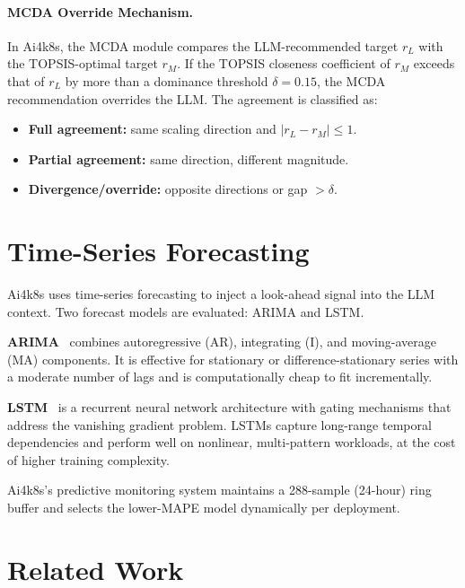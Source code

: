\paragraph{MCDA Override Mechanism.}
In Ai4k8s, the MCDA module compares the LLM-recommended target $r_L$ with the
TOPSIS-optimal target $r_M$. If the TOPSIS closeness coefficient of $r_M$ exceeds
that of $r_L$ by more than a dominance threshold $\delta = 0.15$, the MCDA
recommendation overrides the LLM. The agreement is classified as:
\begin{itemize}
  \item \textbf{Full agreement:} same scaling direction and $|r_L - r_M| \leq 1$.
  \item \textbf{Partial agreement:} same direction, different magnitude.
  \item \textbf{Divergence/override:} opposite directions or gap $> \delta$.
\end{itemize}

\section{Time-Series Forecasting}
\label{sec:forecasting}

Ai4k8s uses time-series forecasting to inject a look-ahead signal into the LLM
context. Two forecast models are evaluated: \gls{ARIMA} and \gls{LSTM}.

\textbf{ARIMA}~\cite{box1970arima} combines autoregressive (AR), integrating (I),
and moving-average (MA) components. It is effective for stationary or
difference-stationary series with a moderate number of lags and is computationally
cheap to fit incrementally.

\textbf{LSTM}~\cite{hochreiter1997lstm} is a recurrent neural network architecture
with gating mechanisms that address the vanishing gradient problem. LSTMs capture
long-range temporal dependencies and perform well on nonlinear, multi-pattern
workloads, at the cost of higher training complexity.

Ai4k8s's predictive monitoring system maintains a 288-sample (24-hour) ring
buffer and selects the lower-MAPE model dynamically per deployment.

\section{Related Work}
\label{sec:related}

